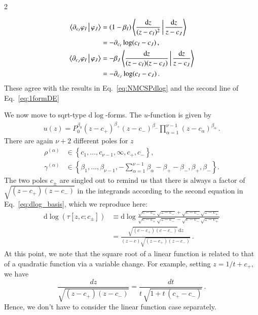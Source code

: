 \documentclass[fleqn]{2023SCGE}
\newcommand{\nn}{\nonumber}
\newcommand{\nd}{\mathrm{d}}
\begin{document}
\begin{multicols}{2}
\begin{appendix}
\begin{align}
\Braket{\partial_{c_I} \varphi_I|\varphi_J} &= (1-\beta_I)  \Braket{\frac{\nd z}{(z-c_I)^2} | \frac{\nd z}{z-c_J}} \nn\\
&= - \partial_{c_I} \log (c_I-c_J) \,, \nn
\\
\Braket{\partial_{c_J} \varphi_I|\varphi_J} &= -\beta_J  \Braket{\frac{\nd z}{(z-c_I)(z-c_J)} | \frac{\nd z}{z-c_J}} \nn\\
&= - \partial_{c_J} \log (c_I-c_J) \,.
\end{align}
These agree with the results in Eq.~\eqref{eq:NMCSPdlog} and the second line of Eq.~\eqref{eq:1formDE}

We now move to sqrt-type $\nd\log$-forms. The $u$-function is given by
\begin{align}
	u(z) = P_0^{\beta_0} (z-c_+)^{\beta_+} (z-c_-)^{\beta_-} \prod_{\alpha=1}^{\nu-1} (z-c_\alpha)^{\beta_\alpha} \,.
\end{align}
There are again $\nu+2$ different poles for $z$
\begin{align}
    \rho^{(\alpha)} &\in \left\{ c_1, \ldots, c_{\nu-1}, \infty, c_+, c_- \right\} , \nn
    \\
    \gamma^{(\alpha)} &\in \left\{ \beta_1, \ldots, \beta_{\nu-1}, -\sum_{\alpha=1}^{\nu-1} \beta_\alpha - \beta_+ - \beta_-, \beta_+, \beta_- \right\} .
\end{align}
The two poles $c_\pm$ are singled out to remind us that there is always a factor of $\sqrt{(z-c_+)(z-c_-)}$ in the integrands according to the second equation in Eq.~\eqref{eq:dlog_basis}, which we reproduce here:
\begin{align}
    \nd \log(\tau[z,c;c_{\pm}]) &\equiv \nd \log \frac{\sqrt{c-c_+} \sqrt{z-c_-}+\sqrt{c-c_-} \sqrt{z-c_+}}{\sqrt{c-c_+} \sqrt{z-c_-}-\sqrt{c-c_-} \sqrt{z-c_+}}
    \nn\\
    &= \frac{\sqrt{(c-c_+)(c-c_-)} \, \nd z}{(z-c)\sqrt{(z-c_+)(z-c_-)}} \,.
\end{align}
At this point, we note that the square root of a linear function is related to that of a quadratic function via a variable change. For example, setting $z = 1/t + c_+$, we have
\begin{equation}
    \frac{dz}{\sqrt{(z-c_+)(z-c_-)}} = \frac{dt}{t \, \sqrt{1+t\,(c_+-c_-)}} \,.
\end{equation}
Hence, we don't have to consider the linear function case separately.


\end{appendix}
\end{multicols}
\end{document}
